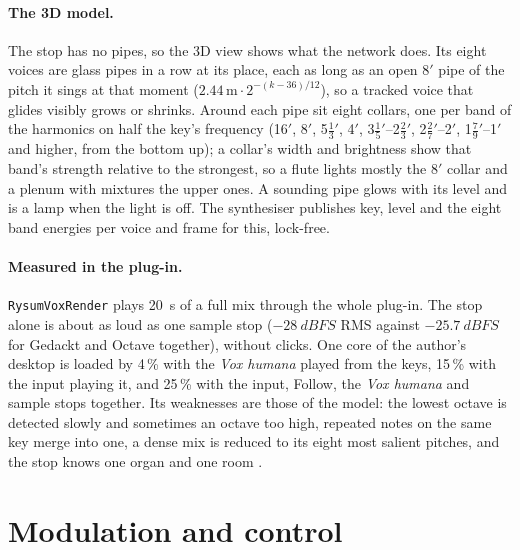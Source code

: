 \documentclass[11pt,a4paper,parskip=half,DIV=11,toc=bibliography]{scrartcl}
\newcommand{\ui}[1]{\emph{#1}}                 %
\newcommand{\fn}[1]{\mbox{\texttt{#1}}}
\begin{document}
\paragraph{The 3D model.} The stop has no pipes, so the 3D view shows what the network does. Its eight voices are glass pipes in a row at its place, each
as long as an open 8$'$ pipe of the pitch it sings at that moment ($2.44\,\mathrm{m}\cdot2^{-(k-36)/12}$), so a tracked voice that glides visibly
grows or shrinks. Around each pipe sit eight collars, one per band of the harmonics on half the key's frequency (16$'$, 8$'$, 5$\frac13'$, 4$'$, 3$\frac15'$--2$\frac23'$,
2$\frac27'$--2$'$, 1$\frac79'$--1$'$ and higher, from the bottom up); a collar's width and brightness show that band's strength relative to the strongest,
so a flute lights mostly the 8$'$ collar and a plenum with mixtures the upper ones. A sounding pipe glows with its level and is a lamp when the
light is off. The synthesiser publishes key, level and the eight band energies per voice and frame for this, lock-free.

\paragraph{Measured in the plug-in.} \fn{RysumVoxRender} plays \SI{20}{s} of a full mix through the whole plug-in. The stop alone is about as loud
as one sample stop ($\SI{-28}{dBFS}$ RMS against $\SI{-25.7}{dBFS}$ for Gedackt and Octave together), without clicks. One core of the author's desktop
is loaded by 4\,\% with the \ui{Vox humana} played from the keys, 15\,\% with the input playing it, and 25\,\% with the input, Follow, the
\ui{Vox humana} and sample stops together. Its weaknesses are those of the model: the lowest octave is detected slowly and sometimes an octave too high,
repeated notes on the same key merge into one, a dense mix is reduced to its eight most salient pitches, and the stop knows one organ and one room
\citep{neuralrysum2}.

\section{Modulation and control}
\label{sec:modulation}
\end{document}
